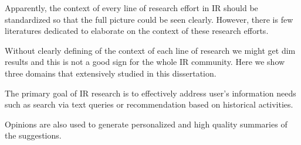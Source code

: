 Apparently, the context of 
every line of research effort in IR should be standardized so that the 
full picture could be seen clearly. 
However, there is few literatures dedicated to elaborate on the context 
of these research efforts.



Without clearly defining of the context of each line of research we might get  
dim results and this is not a good sign for the whole IR community. 
Here we show three domains that extensively studied in this dissertation. 




The primary goal of IR research is to effectively address user's 
information needs such as search via text queries or recommendation 
based on historical activities. 

Opinions are also used to generate personalized and high 
quality summaries of the suggestions. 